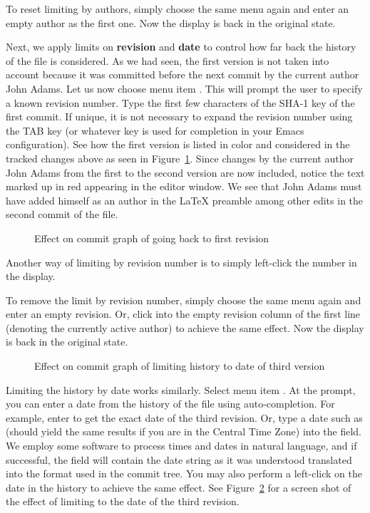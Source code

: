 To reset limiting by authors, simply choose the same menu  again and enter an empty author as the first one.  Now the display is back in the original state.

Next, we apply limits on \textbf{revision} and \textbf{date} to control how far back the history of the file is considered.  As we had seen, the first version is not taken into account because it was committed before the next commit by the current author John Adams.  Let us now choose menu item .  This will prompt the user to specify a known revision number.  Type the first few characters  of the SHA-1 key of the first commit.  If unique, it is not necessary to expand the revision number using the TAB key (or whatever key is used for completion in your Emacs configuration).  See how the first version is listed in color and considered in the tracked changes above as seen in Figure~\ref{fig:svn-emacs-limit-rev}.  Since changes by the current author John Adams from the first to the second version are now included, notice the text marked up in red appearing in the editor window. We see that John Adams must have added himself as an author in the LaTeX preamble among other edits in the second commit of the file. 

\begin{figure}
\centering
\caption{Effect on commit graph of going back to first revision} \label{fig:svn-emacs-limit-rev}
\end{figure}

Another way of limiting by revision number is to simply left-click the number in the display.  

To remove the limit by revision number, simply choose the same menu  again and enter an empty revision. Or, click into the empty revision column of the first line (denoting the currently active author) to achieve the same effect.  Now the display is back in the original state.

\begin{figure}
\centering
{}
\caption{Effect on commit graph of limiting history to date of third version} \label{fig:svn-emacs-limit-date}
\end{figure}

Limiting the history by date works similarly.  Select menu item . At the prompt, you can enter a date from the history of the file using auto-completion.  For example, enter  to get the exact date of the third revision.  Or, type a date such as  (should yield the same results if you are in the Central Time Zone) into the field.  We employ some software to process times and dates in natural language, and if successful, the field will contain the date string as it was understood translated into the format used in the commit tree. You may also perform a left-click on the date in the history to achieve the same effect.  See Figure~\ref{fig:svn-emacs-limit-date} for a screen shot of the effect of limiting to the date of the third revision. 

